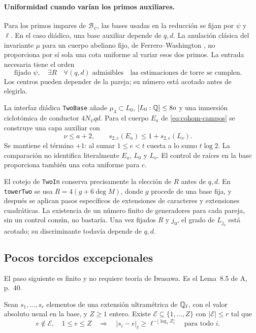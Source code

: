 \paragraph{Uniformidad cuando varían los primos auxiliares.}
Para los primos impares de $\mathcal B_\psi$, las bases
usadas en la reducción se fijan por $\psi$ y $\ell$.
En el caso diádico, una base auxiliar depende de $q,d$.
La anulación clásica del invariante $\mu$ para un
cuerpo abeliano fijo, de Ferrero--Washington
\cite{ferrero-washington}, no proporciona por sí sola
una cota uniforme al variar esos dos primos.
La entrada necesaria tiene el orden
\[
 \text{fijado }\psi,\quad
 \exists R\quad\forall(q,d)\text{ admisibles}\quad
 \text{las estimaciones de torre se cumplen}.
\]
Los centros pueden depender de la pareja; su número
está acotado antes de elegirla.

La interfaz diádica \texttt{TwoBase} añade
$\mu_4\subset L_0$, $[L_0:\mathbb{Q}]\le8o$ y una inmersión
ciclotómica de conductor $4N_\psi qd$.
Para el cuerpo $E_a$ de \eqref{eq:cohom-campos}
se construye una capa auxiliar con
\begin{equation}
 \nu\le a+2,\qquad
 s_{2,e}(E_a)\le1+s_{2,e}(L_\nu).
 \label{eq:cohom-puente-diadico}
\end{equation}
Se mantiene el término $+1$: al sumar $1\le e<t$
cuesta a lo sumo $t\log2$.
La comparación no identifica literalmente $E_a$,
$L_0$ y $L_\nu$.
El control de raíces en la base proporciona también
una cota uniforme para $c$.

El cotejo de \texttt{TwoIn} conserva precisamente
la elección de $R$ antes de $q,d$.
En \texttt{towerTwo} se usa
$R=4(g+6\deg M)$, donde $g$ procede de una base fija,
y después se aplican pasos específicos de extensiones
de caracteres y extensiones cuadráticas.
La existencia de un número finito de generadores para
cada pareja, sin un control común, no bastaría.
Una vez fijados $R$ y $j_0$, el grado de $L_{j_0}$
está acotado; su discriminante todavía depende de $q,d$.

\subsection{Pocos torcidos excepcionales}

El paso siguiente es finito y no requiere teoría de
Iwasawa. Es el Lema~8.5 de A, p.~40.

\begin{lema}
\label{lem:cohom-excepcionales}
Sean $s_1,\ldots,s_r$ elementos de una extensión
ultramétrica de $\mathbb{Q}_\ell$, con el valor absoluto usual
en la base, y $Z\ge1$ entero.
Existe $\mathcal E\subseteq\{1,\ldots,Z\}$ con
$|\mathcal E|\le r$ tal que
\[
 e\notin\mathcal E,\quad1\le e\le Z
 \quad\Longrightarrow\quad
 |s_i-e|_\ell\ge\ell^{-\lfloor\log_\ell Z\rfloor}
 \quad\text{para todo }i.
\]
\end{lema}

